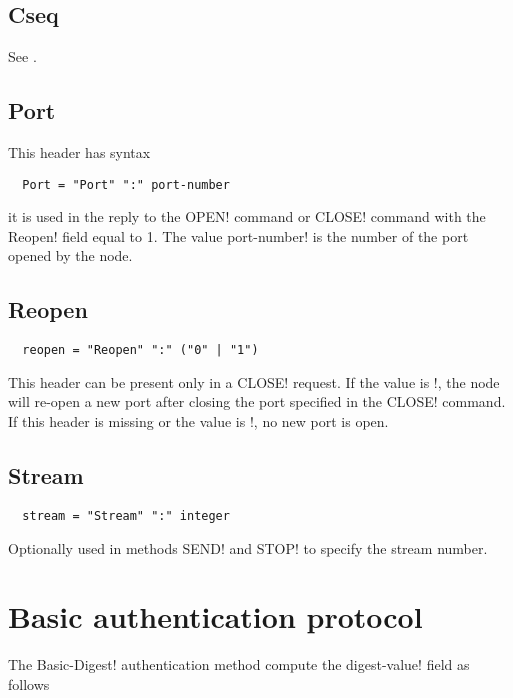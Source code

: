 \subsection{Cseq}
\label{subsub:7.1.2;transport_layer}

See \cite[Section~12.17]{rfc2326}.

\subsection{Port}
\label{sub:7.2;transport_layer}

This header has syntax
%
\begin{verbatim}
  Port = "Port" ":" port-number 
\end{verbatim}
%
it is used in the reply to the \ttt OPEN! command or \ttt CLOSE!
command with the \ttt Reopen! field equal to 1.  The value \ttt
port-number! is the number of the port opened by the node.

\subsection{Reopen}
\label{subsub:7.1.4;transport_layer}

\begin{verbatim}
  reopen = "Reopen" ":" ("0" | "1")
\end{verbatim}
%
This header can be present only in a \ttt CLOSE! request.  If the
value is !, the node will re-open a new port after closing the
port specified in the \ttt CLOSE! command.  If this header is missing
or the value is !, no new port is open.

\subsection{Stream}
\label{subsub:7.1.1;transport_layer}

\begin{verbatim}
  stream = "Stream" ":" integer
\end{verbatim}
%
Optionally used in methods \ttt SEND! and \ttt STOP!  to specify the
stream number.

\section{Basic authentication protocol}
\label{sub:7.3;transport_layer}

The \ttt Basic-Digest! authentication method compute the \ttt
digest-value! field as follows

